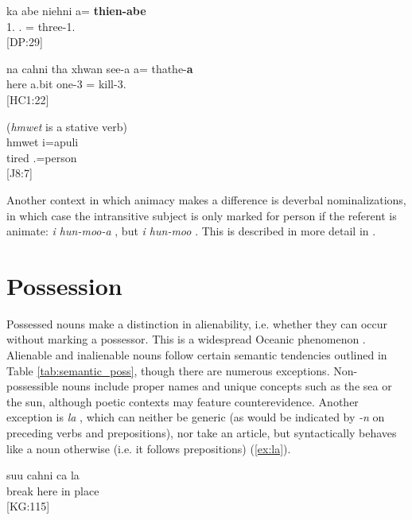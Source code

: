 	\ea\label{ex:animNstV}
	\gll ka abe niehni a= \textbf{thien-abe}\\	
	  1. . = three-1.\\
	\glt {} {[DP:29]}
	\z
	
	
	\ea\label{ex:animNOBJ}
	\gll na cahni tha xhwan see-a a= thathe-\textbf{a}\\	
	  here  a.bit one-3 = kill-3.\\
	\glt {} {[HC1:22]}
	\z
	


\ea \label{ex:animNinVP}
(\textit{hmwet} is a stative verb)\\
\gll hmwet i=apuli\\
 tired .=person\\
\glt {} {[J8:7]}
\z

Another context in which animacy makes a difference is deverbal nominalizations, in which case the intransitive subject is only marked for person if the referent is animate: \textit{i hun-moo-a}  , but \textit{i hun-moo} . This is described in more detail in .
\section{Possession}
\label{sec:Poss}

Possessed nouns make a distinction in alienability, i.e. whether they can occur without marking a possessor. This is a widespread Oceanic phenomenon \parencite[511]{ross_morphosyntactic_2004}. Alienable and inalienable nouns follow certain semantic tendencies outlined in Table \ref{tab:semantic_poss}, though there are numerous exceptions. Non-possessible nouns include proper names and unique concepts such as the sea or the sun, although poetic contexts may feature counterevidence. Another exception is \textit{la} , which can neither be generic (as would be indicated by \textit{-n} on preceding verbs and prepositions), nor take an article, but syntactically behaves like a noun otherwise (i.e. it follows prepositions) (\ref{ex:la}).

\ea \label{ex:la}
\gll suu cahni ca la\\
 break here in place\\
\glt {} {[KG:115]}
\z 

